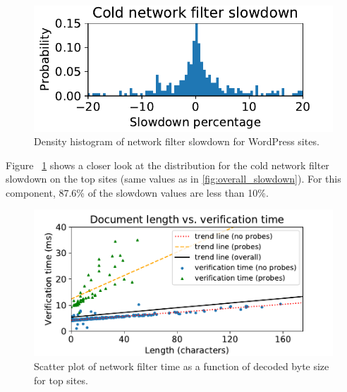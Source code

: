 \begin{figure}[h]
	\includegraphics[scale=0.5]{results/density_histogram_filter_slowdown_small.pdf}
	\caption{Density histogram of network filter slowdown for WordPress sites.}
	\label{fig:histogram_slowdown}
\end{figure}


Figure ~\ref{fig:histogram_slowdown} shows a closer look at the distribution for the cold network filter slowdown on the top sites (same values as in \autoref{fig:overall_slowdown}). For this component, 87.6\% of the slowdown values are less than 10\%.

\begin{figure}[h]
	\includegraphics[scale=0.5]{results/string_length_vs_verification_time_small.pdf}
	\caption{Scatter plot of network filter time as a function of decoded byte size for top sites.}
	\label{fig:verification_time_string_length}
\end{figure}

